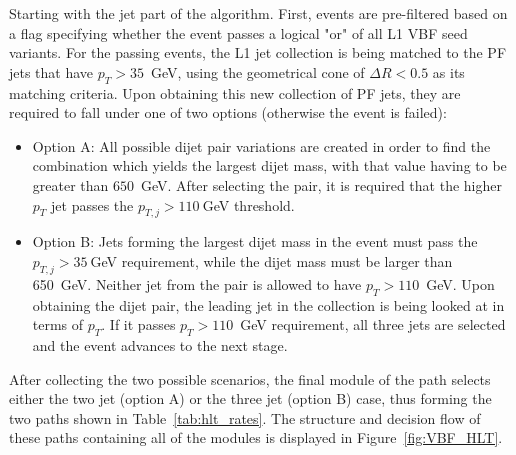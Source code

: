 Starting with the jet part of the algorithm. First, events are pre-filtered based on a flag specifying whether the event passes a logical "or" of all L1 VBF seed variants. For the passing events, the L1 jet collection is being matched to the PF jets that have $p_T>35$~GeV, using the geometrical cone of $\Delta R<0.5$ as its matching criteria. Upon obtaining this new collection of PF jets, they are required to fall under one of two options (otherwise the event is failed):
\begin{itemize}
    \item Option A: All possible dijet pair variations are created in order to find the combination which yields the largest dijet mass, with that value having to be greater than $650$~GeV. After selecting the pair, it is required that the higher $p_T$ jet passes  the $p_{T,j}>110~$GeV threshold.
    
    \item Option B: Jets forming the largest dijet mass in the event must pass the $p_{T,j}>35~$GeV requirement, while the dijet mass must be larger than 650~GeV. Neither jet from the pair is allowed to have $p_T>110$~GeV. Upon obtaining the dijet pair, the leading jet in the collection is being looked at in terms of $p_T$. If it passes $p_T>110$~GeV requirement, all three jets are selected and the event advances to the next stage.
\end{itemize}
After collecting the two possible scenarios, the final module of the path selects either the two jet (option A) or the three jet (option B) case, thus forming the two paths shown in Table~\ref{tab:hlt_rates}. The structure and decision flow of these paths containing all of the modules is displayed in Figure~\ref{fig:VBF_HLT}.
